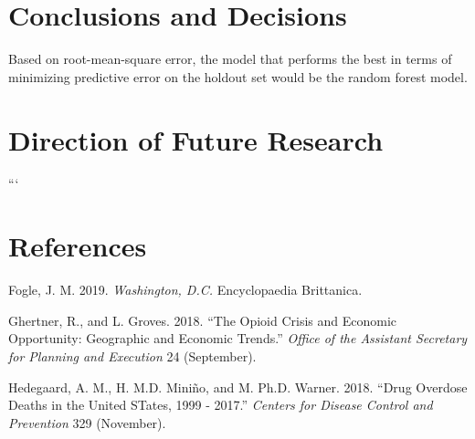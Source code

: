 \documentclass[]{article}
\begin{document}
\section{Conclusions and Decisions}

Based on root-mean-square error, the model that performs the best in
terms of minimizing predictive error on the holdout set would be the
random forest model.

\section{Direction of Future Research}

```

\section{References}

\hypertarget{refs}{}
\hypertarget{ref-Brittanica}{}
Fogle, J. M. 2019. \emph{Washington, D.C.} Encyclopaedia Brittanica.

\hypertarget{ref-Ghertner2018}{}
Ghertner, R., and L. Groves. 2018. ``The Opioid Crisis and Economic
Opportunity: Geographic and Economic Trends.'' \emph{Office of the
Assistant Secretary for Planning and Execution} 24 (September).

\hypertarget{ref-Hedegaard2018}{}
Hedegaard, A. M., H. M.D. Miniño, and M. Ph.D. Warner. 2018. ``Drug
Overdose Deaths in the United STates, 1999 - 2017.'' \emph{Centers for
Disease Control and Prevention} 329 (November).
\end{document}
